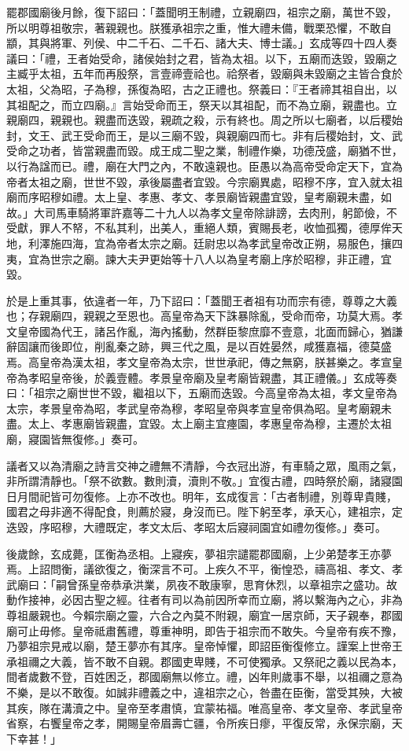 \begin{pinyinscope}
罷郡國廟後月餘，復下詔曰：「蓋聞明王制禮，立親廟四，祖宗之廟，萬世不毀，所以明尊祖敬宗，著親親也。朕獲承祖宗之重，惟大禮未備，戰栗恐懼，不敢自顓，其與將軍、列侯、中二千石、二千石、諸大夫、博士議。」玄成等四十四人奏議曰：「禮，王者始受命，諸侯始封之君，皆為太祖。以下，五廟而迭毀，毀廟之主臧乎太祖，五年而再殷祭，言壹禘壹祫也。祫祭者，毀廟與未毀廟之主皆合食於太祖，父為昭，子為穆，孫復為昭，古之正禮也。祭義曰：『王者禘其祖自出，以其祖配之，而立四廟。』言始受命而王，祭天以其祖配，而不為立廟，親盡也。立親廟四，親親也。親盡而迭毀，親疏之殺，示有終也。周之所以七廟者，以后稷始封，文王、武王受命而王，是以三廟不毀，與親廟四而七。非有后稷始封，文、武受命之功者，皆當親盡而毀。成王成二聖之業，制禮作樂，功德茂盛，廟猶不世，以行為諡而已。禮，廟在大門之內，不敢遠親也。臣愚以為高帝受命定天下，宜為帝者太祖之廟，世世不毀，承後屬盡者宜毀。今宗廟異處，昭穆不序，宜入就太祖廟而序昭穆如禮。太上皇、孝惠、孝文、孝景廟皆親盡宜毀，皇考廟親未盡，如故。」大司馬車騎將軍許嘉等二十九人以為孝文皇帝除誹謗，去肉刑，躬節儉，不受獻，罪人不帑，不私其利，出美人，重絕人類，賓賜長老，收恤孤獨，德厚侔天地，利澤施四海，宜為帝者太宗之廟。廷尉忠以為孝武皇帝改正朔，易服色，攘四夷，宜為世宗之廟。諫大夫尹更始等十八人以為皇考廟上序於昭穆，非正禮，宜毀。

於是上重其事，依違者一年，乃下詔曰：「蓋聞王者祖有功而宗有德，尊尊之大義也；存親廟四，親親之至恩也。高皇帝為天下誅暴除亂，受命而帝，功莫大焉。孝文皇帝國為代王，諸呂作亂，海內搖動，然群臣黎庶靡不壹意，北面而歸心，猶謙辭固讓而後即位，削亂秦之跡，興三代之風，是以百姓晏然，咸獲嘉福，德莫盛焉。高皇帝為漢太祖，孝文皇帝為太宗，世世承祀，傳之無窮，朕甚樂之。孝宣皇帝為孝昭皇帝後，於義壹體。孝景皇帝廟及皇考廟皆親盡，其正禮儀。」玄成等奏曰：「祖宗之廟世世不毀，繼祖以下，五廟而迭毀。今高皇帝為太祖，孝文皇帝為太宗，孝景皇帝為昭，孝武皇帝為穆，孝昭皇帝與孝宣皇帝俱為昭。皇考廟親未盡。太上、孝惠廟皆親盡，宜毀。太上廟主宜瘞園，孝惠皇帝為穆，主遷於太祖廟，寢園皆無復修。」奏可。

議者又以為清廟之詩言交神之禮無不清靜，今衣冠出游，有車騎之眾，風雨之氣，非所謂清靜也。「祭不欲數。數則瀆，瀆則不敬。」宜復古禮，四時祭於廟，諸寢園日月間祀皆可勿復修。上亦不改也。明年，玄成復言：「古者制禮，別尊卑貴賤，國君之母非適不得配食，則薦於寢，身沒而已。陛下躬至孝，承天心，建祖宗，定迭毀，序昭穆，大禮既定，孝文太后、孝昭太后寢祠園宜如禮勿復修。」奏可。

後歲餘，玄成薨，匡衡為丞相。上寢疾，夢祖宗譴罷郡國廟，上少弟楚孝王亦夢焉。上詔問衡，議欲復之，衡深言不可。上疾久不平，衡惶恐，禱高祖、孝文、孝武廟曰：「嗣曾孫皇帝恭承洪業，夙夜不敢康寧，思育休烈，以章祖宗之盛功。故動作接神，必因古聖之經。往者有司以為前因所幸而立廟，將以繫海內之心，非為尊祖嚴親也。今賴宗廟之靈，六合之內莫不附親，廟宜一居京師，天子親奉，郡國廟可止毋修。皇帝祗肅舊禮，尊重神明，即告于祖宗而不敢失。今皇帝有疾不豫，乃夢祖宗見戒以廟，楚王夢亦有其序。皇帝悼懼，即詔臣衡復修立。謹案上世帝王承祖禰之大義，皆不敢不自親。郡國吏卑賤，不可使獨承。又祭祀之義以民為本，間者歲數不登，百姓困乏，郡國廟無以修立。禮，凶年則歲事不舉，以祖禰之意為不樂，是以不敢復。如誠非禮義之中，違祖宗之心，咎盡在臣衡，當受其殃，大被其疾，隊在溝瀆之中。皇帝至孝肅慎，宜蒙祐福。唯高皇帝、孝文皇帝、孝武皇帝省察，右饗皇帝之孝，開賜皇帝眉壽亡疆，令所疾日瘳，平復反常，永保宗廟，天下幸甚！」


\end{pinyinscope}
